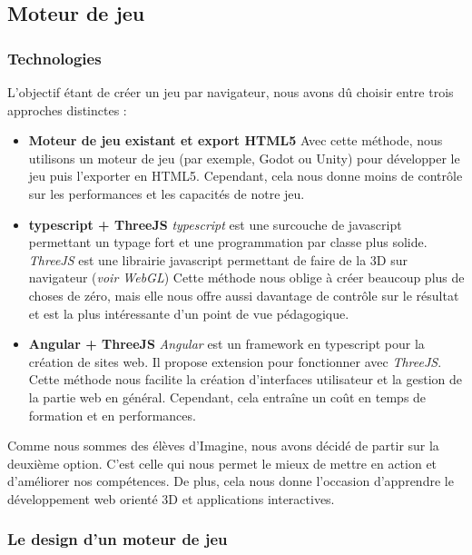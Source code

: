 \subsection{Moteur de jeu}

\subsubsection{Technologies}
    L'objectif étant de créer un jeu  par navigateur, nous avons dû choisir entre trois approches distinctes :
    \begin{itemize}
        \item \textbf{Moteur de jeu existant et export HTML5} \newline Avec cette méthode, nous utilisons un moteur de jeu (par exemple, Godot ou Unity) pour développer le jeu puis l'exporter en HTML5. Cependant, cela nous donne moins de contrôle sur les performances et les capacités de notre jeu.
        \item \textbf{typescript + ThreeJS} \newline \textit{typescript} est une surcouche de javascript permettant un typage fort et une programmation par classe plus solide. \textit{ThreeJS} est une librairie javascript permettant de faire de la 3D sur navigateur (\textit{voir WebGL}) Cette méthode nous oblige à créer beaucoup plus de choses de zéro, mais elle nous offre aussi davantage de contrôle sur le résultat et est la plus intéressante d'un point de vue pédagogique.
        \item \textbf{Angular + ThreeJS} \newline \textit{Angular} est un framework en typescript pour la création de sites web. Il propose extension pour fonctionner avec \textit{ThreeJS}. Cette méthode nous facilite la création d'interfaces utilisateur et la gestion de la partie web en général. Cependant, cela entraîne un coût en temps de formation et en performances.
    \end{itemize}

    Comme nous sommes des élèves d'Imagine, nous avons décidé de partir sur la deuxième option. C'est celle qui nous permet le mieux de mettre en action et d'améliorer nos compétences. De plus, cela nous donne l'occasion d'apprendre le développement web orienté 3D et applications interactives.
    
\subsubsection{Le design d'un moteur de jeu}

